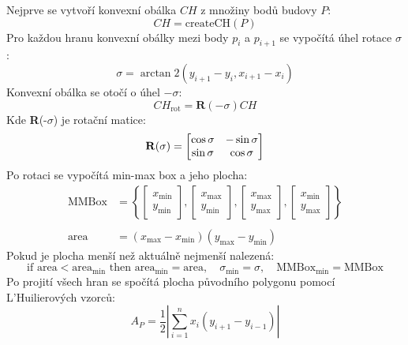 \hspace{-1.15cm}
Nejprve se vytvoří konvexní obálka \( CH \) z množiny bodů budovy \( P \):
\begin{equation}
    CH = \text{createCH}(P)
\end{equation}
Pro každou hranu konvexní obálky mezi body \( p_i \) a \( p_{i+1} \) se vypočítá úhel rotace \( \sigma \):
\begin{equation}
    \sigma = \arctan2(y_{i+1} - y_i, x_{i+1} - x_i)
\end{equation}
Konvexní obálka se otočí o úhel \( -\sigma \):
\begin{equation}
    CH_{\text{rot}} = \mathbf{R}(-\sigma) CH
\end{equation}
Kde \textbf{R}(-\(\sigma\)) je rotační matice:
\[
\mathbf{R}(\-\sigma) = 
\begin{bmatrix}
\cos\-\sigma & -\sin\-\sigma \\
\sin\-\sigma & \cos\-\sigma
\end{bmatrix}
\]
Po rotaci se vypočítá min-max box a jeho plocha:
\begin{align}
    \text{MMBox} &= \left\{
    \begin{bmatrix} x_{\min} \\ y_{\min} \end{bmatrix},
    \begin{bmatrix} x_{\max} \\ y_{\min} \end{bmatrix},
    \begin{bmatrix} x_{\max} \\ y_{\max} \end{bmatrix},
    \begin{bmatrix} x_{\min} \\ y_{\max} \end{bmatrix}
    \right\}\\
    \nonumber\\
    \text{area} &= (x_{\max} - x_{\min})(y_{\max} - y_{\min})
\end{align}
Pokud je plocha menší než aktuálně nejmenší nalezená:
\begin{equation}
    \text{if } \text{area} < \text{area}_{\min} \text{ then } 
    \text{area}_{\min} = \text{area},\quad
    \sigma_{\min} = \sigma,\quad
    \text{MMBox}_{\min} = \text{MMBox}
\end{equation}
Po projití všech hran se spočítá plocha původního polygonu pomocí L'Huilierových vzorců:
\begin{equation}
    A_P = \frac{1}{2} \left| \sum_{i=1}^{n} x_i(y_{i+1} - y_{i-1}) \right|
\end{equation}
